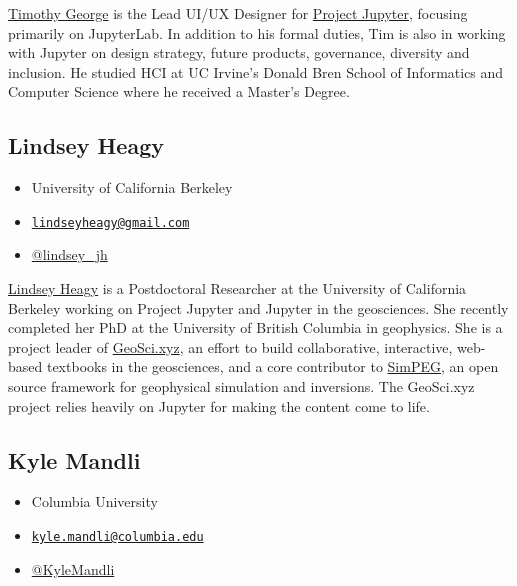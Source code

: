 \documentclass[]{book}
\providecommand{\tightlist}{%
  \setlength{\itemsep}{0pt}\setlength{\parskip}{0pt}}
\begin{document}
\href{https://www.tgeorgeux.com/}{Timothy George} is the Lead UI/UX Designer for
\href{https://jupyter.org/}{Project Jupyter}, focusing primarily on JupyterLab.
In addition to his formal duties, Tim is also in working with Jupyter on
design strategy, future products, governance, diversity and inclusion.
He studied HCI at UC Irvine's Donald Bren School of Informatics and Computer Science
where he received a Master's Degree.

\hypertarget{lindsey-heagy}{%
\subsection*{Lindsey Heagy}\label{lindsey-heagy}}

\begin{itemize}
\tightlist
\item
  University of California Berkeley
\item
  \href{mailto:lindseyheagy@gmail.com}{\nolinkurl{lindseyheagy@gmail.com}}
\item
  \href{https://twitter.com/lindsey_jh}{@lindsey\_jh}
\end{itemize}

\href{https://www.lindseyjh.ca/}{Lindsey Heagy} is a Postdoctoral Researcher at the
University of California Berkeley working on Project Jupyter and Jupyter in the
geosciences. She recently completed her PhD at the University of British Columbia
in geophysics. She is a project leader of \href{http://geosci.xyz}{GeoSci.xyz},
an effort to build collaborative, interactive, web-based textbooks in the geosciences,
and a core contributor to \href{https://www.simpeg.xyz/}{SimPEG}, an open source framework
for geophysical simulation and inversions. The GeoSci.xyz project relies heavily on
Jupyter for making the content come to life.

\hypertarget{kyle-mandli}{%
\subsection*{Kyle Mandli}\label{kyle-mandli}}

\begin{itemize}
\tightlist
\item
  Columbia University
\item
  \href{mailto:kyle.mandli@columbia.edu}{\nolinkurl{kyle.mandli@columbia.edu}}
\item
  \href{https://twitter.com/KyleMandli}{@KyleMandli}
\end{itemize}
\end{document}
